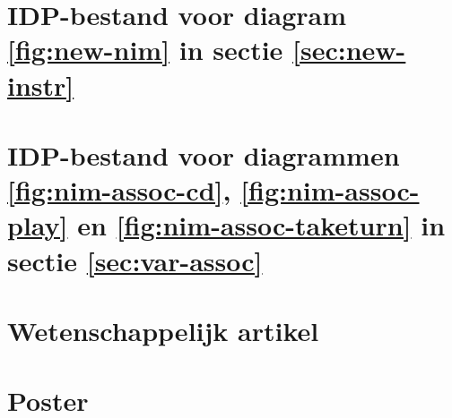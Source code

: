 
\chapter{IDP-bestand voor diagram \ref{fig:new-nim} in sectie \ref{sec:new-instr}}\label{app:new-nim}

\label{code:new-nim}

\chapter{IDP-bestand voor diagrammen \ref{fig:nim-assoc-cd}, \ref{fig:nim-assoc-play} en \ref{fig:nim-assoc-taketurn} in sectie \ref{sec:var-assoc}}\label{app:nim-assoc}

\label{code:nim-assoc}

\chapter{Wetenschappelijk artikel}



\chapter{Poster}

